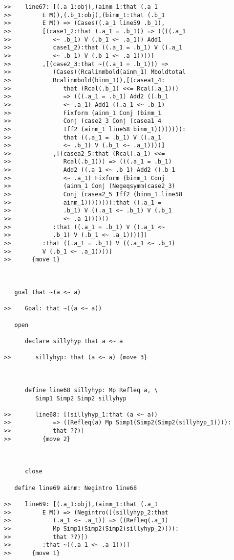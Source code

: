 \documentclass[12pt]{article}
\begin{document}
\begin{verbatim}
>>    line67: [(.a_1:obj),(ainm_1:that (.a_1
>>         E M)),(.b_1:obj),(binm_1:that (.b_1
>>         E M)) => (Cases((.a_1 line59 .b_1),
>>         [(case1_2:that (.a_1 = .b_1)) => ((((.a_1
>>            <~ .b_1) V (.b_1 <~ .a_1)) Add1
>>            case1_2):that ((.a_1 = .b_1) V ((.a_1
>>            <~ .b_1) V (.b_1 <~ .a_1))))]
>>         ,[(case2_3:that ~((.a_1 = .b_1))) =>
>>            (Cases((Rcalinmbold(ainm_1) Mboldtotal
>>            Rcalinmbold(binm_1)),[(casea1_4:
>>               that (Rcal(.b_1) <<= Rcal(.a_1)))
>>               => (((.a_1 = .b_1) Add2 ((.b_1
>>               <~ .a_1) Add1 ((.a_1 <~ .b_1)
>>               Fixform (ainm_1 Conj (binm_1
>>               Conj (case2_3 Conj (casea1_4
>>               Iff2 (ainm_1 line58 binm_1)))))))):
>>               that ((.a_1 = .b_1) V ((.a_1
>>               <~ .b_1) V (.b_1 <~ .a_1))))]
>>            ,[(casea2_5:that (Rcal(.a_1) <<=
>>               Rcal(.b_1))) => (((.a_1 = .b_1)
>>               Add2 ((.a_1 <~ .b_1) Add2 ((.b_1
>>               <~ .a_1) Fixform (binm_1 Conj
>>               (ainm_1 Conj (Negeqsymm(case2_3)
>>               Conj (casea2_5 Iff2 (binm_1 line58
>>               ainm_1)))))))):that ((.a_1 =
>>               .b_1) V ((.a_1 <~ .b_1) V (.b_1
>>               <~ .a_1))))])
>>            :that ((.a_1 = .b_1) V ((.a_1 <~
>>            .b_1) V (.b_1 <~ .a_1))))])
>>         :that ((.a_1 = .b_1) V ((.a_1 <~ .b_1)
>>         V (.b_1 <~ .a_1))))]
>>      {move 1}



   goal that ~(a <~ a)

>>    Goal: that ~((a <~ a))

   open

      declare sillyhyp that a <~ a

>>       sillyhyp: that (a <~ a) {move 3}



      define line68 sillyhyp: Mp Refleq a, \
         Simp1 Simp2 Simp2 sillyhyp

>>       line68: [(sillyhyp_1:that (a <~ a))
>>            => ((Refleq(a) Mp Simp1(Simp2(Simp2(sillyhyp_1)))):
>>            that ??)]
>>         {move 2}



      close

   define line69 ainm: Negintro line68

>>    line69: [(.a_1:obj),(ainm_1:that (.a_1
>>         E M)) => (Negintro([(sillyhyp_2:that
>>            (.a_1 <~ .a_1)) => ((Refleq(.a_1)
>>            Mp Simp1(Simp2(Simp2(sillyhyp_2)))):
>>            that ??)])
>>         :that ~((.a_1 <~ .a_1)))]
>>      {move 1}




\end{verbatim}
\end{document}
